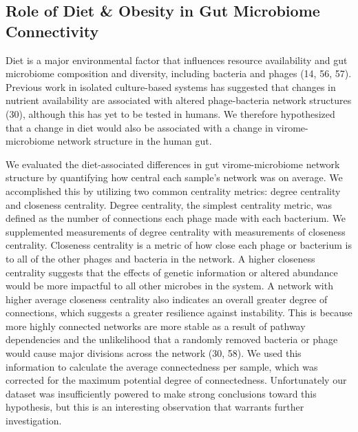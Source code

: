 \documentclass[12pt,]{article}
\begin{document}
\subsection{Role of Diet \& Obesity in Gut Microbiome
Connectivity}\label{role-of-diet-obesity-in-gut-microbiome-connectivity}

Diet is a major environmental factor that influences resource
availability and gut microbiome composition and diversity, including
bacteria and phages (14, 56, 57). Previous work in isolated
culture-based systems has suggested that changes in nutrient
availability are associated with altered phage-bacteria network
structures (30), although this has yet to be tested in humans. We
therefore hypothesized that a change in diet would also be associated
with a change in virome-microbiome network structure in the human gut.

We evaluated the diet-associated differences in gut virome-microbiome
network structure by quantifying how central each sample's network was
on average. We accomplished this by utilizing two common centrality
metrics: degree centrality and closeness centrality. Degree centrality,
the simplest centrality metric, was defined as the number of connections
each phage made with each bacterium. We supplemented measurements of
degree centrality with measurements of closeness centrality. Closeness
centrality is a metric of how close each phage or bacterium is to all of
the other phages and bacteria in the network. A higher closeness
centrality suggests that the effects of genetic information or altered
abundance would be more impactful to all other microbes in the system. A
network with higher average closeness centrality also indicates an
overall greater degree of connections, which suggests a greater
resilience against instability. This is because more highly connected
networks are more stable as a result of pathway dependencies and the
unlikelihood that a randomly removed bacteria or phage would cause major
divisions across the network (30, 58). We used this information to
calculate the average connectedness per sample, which was corrected for
the maximum potential degree of connectedness. Unfortunately our dataset
was insufficiently powered to make strong conclusions toward this
hypothesis, but this is an interesting observation that warrants further
investigation.
\end{document}
